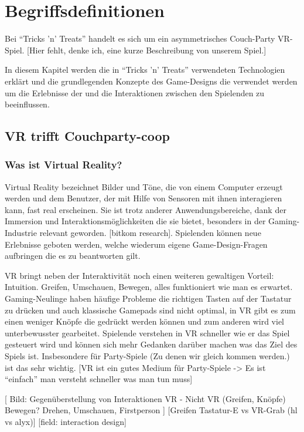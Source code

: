 \chapter{Begriffsdefinitionen}

Bei "`Tricks 'n' Treats"' handelt es sich um ein asymmetrisches Couch-Party VR-Spiel. [Hier fehlt, denke ich, eine kurze Beschreibung von unserem Spiel.]

In diesem Kapitel werden die in "`Tricks 'n' Treats"' verwendeten Technologien erklärt und die grundlegenden Konzepte des Game-Designs die verwendet werden um die  Erlebnisse der und die Interaktionen zwischen den Spielenden zu beeinflussen.

\section{VR trifft Couchparty-coop}

\subsection{Was ist Virtual Reality?}

Virtual Reality bezeichnet Bilder und Töne, die von einem Computer erzeugt werden und dem Benutzer, der mit Hilfe von Sensoren mit ihnen interagieren kann, fast real erscheinen.\cite{_oxford_dict} Sie ist trotz anderer Anwendungsbereiche, dank der Immersion und Interaktionsmöglichkeiten die sie bietet, besonders in der Gaming-Industrie relevant geworden. [bitkom research]. Spielenden können neue Erlebnisse geboten werden, welche wiederum eigene  Game-Design-Fragen aufbringen die es zu beantworten gilt.

VR bringt neben der Interaktivität noch einen weiteren gewaltigen Vorteil: Intuition. Greifen, Umschauen, Bewegen, alles funktioniert wie man es erwartet. Gaming-Neulinge haben häufige Probleme die richtigen Tasten auf der Tastatur zu drücken und auch klassische Gamepads sind nicht optimal, in VR gibt es zum einen weniger Knöpfe die gedrückt werden können und zum anderen wird viel unterbewusster gearbeitet. Spielende verstehen in VR schneller wie er das Spiel gesteuert wird und können sich mehr Gedanken darüber machen was das Ziel des Spiels ist. Insbesondere für Party-Spiele (Zu denen wir gleich kommen werden.) ist das sehr wichtig. [VR ist ein gutes Medium für Party-Spiele -> Es ist "`einfach"' man versteht schneller was man tun muss]

[
Bild: 
	Gegenüberstellung von Interaktionen VR - Nicht VR (Greifen, Knöpfe)
	Bewegen? Drehen, Umschauen, Firstperson
]
[Greifen Tastatur-E vs VR-Grab (hl vs alyx)]
[field: interaction design]

